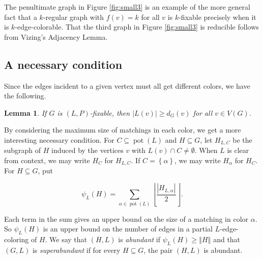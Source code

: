 \documentclass[12pt]{article}
\theoremstyle{plain}
\newtheorem{lem}[thm]{Lemma}
\theoremstyle{definition}
\theoremstyle{remark}
\newcommand{\set}[1]{\left\{ #1 \right\}}
\newcommand{\card}[1]{\left|#1\right|}
\newcommand{\size}[1]{\left\Vert#1\right\Vert}
\newcommand{\floor}[1]{\left\lfloor#1\right\rfloor}
\newcommand{\pot}{\operatorname{pot}}
\begin{document}
The penultimate graph in Figure \ref{fig:small3} is an example of the more
general fact that a $k$-regular graph with $f(v) = k$ for all $v$ is $k$-fixable
precisely when it is $k$-edge-colorable.  That the third graph in Figure
\ref{fig:small3} is reducible follows from Vizing's Adjacency Lemma.
\subsection{A necessary condition}
Since the edges incident to a given vertex must all get different colors, we have the following.

\begin{lem}\label{DegreeNecessaryCondition}
If $G$ is $(L, P)$-fixable, then $|L(v)| \ge d_G(v)$ for all $v \in V(G)$.
\end{lem}

By considering the maximum size of matchings in each color, we get a more interesting necessary condition.
For $C \subseteq \pot(L)$ and $H \subseteq G$, let $H_{L, C}$ be the
subgraph of $H$ induced by the vertices $v$ with $L(v) \cap C \ne \emptyset$. 
When $L$ is clear from context, we may write $H_C$ for $H_{L,C}$. If $C =
\set{\alpha}$, we may write $H_\alpha$ for $H_C$.  For $H \subseteq G$, put

\[\psi_L(H) = \sum_{\alpha \in \pot(L)} \floor{\frac{\card{H_{L, \alpha}}}{2}}.\]

Each term in the sum gives an upper bound on the size of a matching in color
$\alpha$. So $\psi_L(H)$ is an upper bound on the number of edges in a
partial $L$-edge-coloring of $H$.  We say that $(H, L)$ is \emph{abundant} if
$\psi_L(H) \ge \size{H}$ and that $(G,L)$ is \emph{superabundant} if for every
$H \subseteq G$, the pair $(H, L)$ is abundant.  
\end{document}

